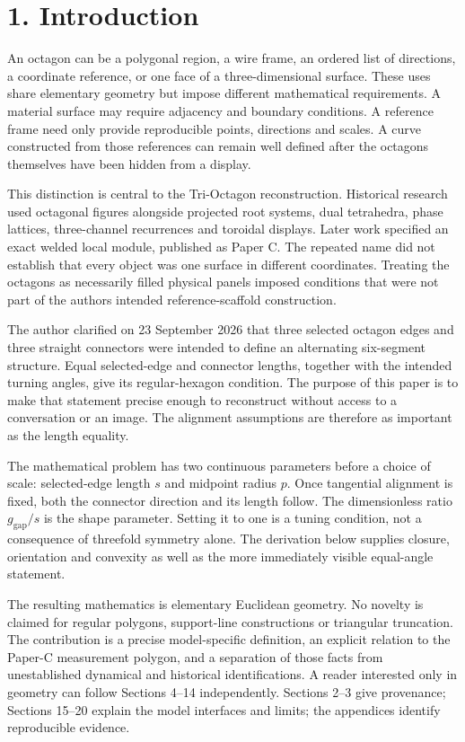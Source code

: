 \documentclass[
  11pt,
  a4paper,
]{article}
\begin{document}
\section{1. Introduction}\label{introduction}

An octagon can be a polygonal region, a wire frame, an ordered list of directions, a coordinate reference, or one face of a three-dimensional surface. These uses share elementary geometry but impose different mathematical requirements. A material surface may require adjacency and boundary conditions. A reference frame need only provide reproducible points, directions and scales. A curve constructed from those references can remain well defined after the octagons themselves have been hidden from a display.

This distinction is central to the Tri-Octagon reconstruction. Historical research used octagonal figures alongside projected root systems, dual tetrahedra, phase lattices, three-channel recurrences and toroidal displays. Later work specified an exact welded local module, published as Paper C. The repeated name did not establish that every object was one surface in different coordinates. Treating the octagons as necessarily filled physical panels imposed conditions that were not part of the author\textquotesingle s intended reference-scaffold construction.

The author clarified on 23 September 2026 that three selected octagon edges and three straight connectors were intended to define an alternating six-segment structure. Equal selected-edge and connector lengths, together with the intended turning angles, give its regular-hexagon condition. The purpose of this paper is to make that statement precise enough to reconstruct without access to a conversation or an image. The alignment assumptions are therefore as important as the length equality.

The mathematical problem has two continuous parameters before a choice of scale: selected-edge length \(s\) and midpoint radius \(p\). Once tangential alignment is fixed, both the connector direction and its length follow. The dimensionless ratio \(g_{\mathrm{gap}}/s\) is the shape parameter. Setting it to one is a tuning condition, not a consequence of threefold symmetry alone. The derivation below supplies closure, orientation and convexity as well as the more immediately visible equal-angle statement.

The resulting mathematics is elementary Euclidean geometry. No novelty is claimed for regular polygons, support-line constructions or triangular truncation. The contribution is a precise model-specific definition, an explicit relation to the Paper-C measurement polygon, and a separation of those facts from unestablished dynamical and historical identifications. A reader interested only in geometry can follow Sections 4--14 independently. Sections 2--3 give provenance; Sections 15--20 explain the model interfaces and limits; the appendices identify reproducible evidence.
\end{document}
